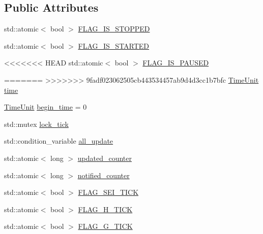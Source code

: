\subsection*{Public Attributes}
{\bf }\par
\begin{DoxyCompactItemize}
\item 
std\+::atomic$<$ bool $>$ \hyperlink{classsolar__core_1_1_w_a9bb998c65a7427961de179f41e25daea}{F\+L\+A\+G\+\_\+\+I\+S\+\_\+\+S\+T\+O\+P\+P\+E\+D}
\item 
std\+::atomic$<$ bool $>$ \hyperlink{classsolar__core_1_1_w_a8456f88d45f2e8bf67eccd7f0c8d08fa}{F\+L\+A\+G\+\_\+\+I\+S\+\_\+\+S\+T\+A\+R\+T\+E\+D}
\item 
<<<<<<< HEAD
std\+::atomic$<$ bool $>$ \hyperlink{classsolar__core_1_1_w_a1c0ebdba727a7a5cbf322072ab5c9184}{F\+L\+A\+G\+\_\+\+I\+S\+\_\+\+P\+A\+U\+S\+E\+D}
\item 
=======
>>>>>>> 9fadf023062505cb443534457ab9d4d3cc1b7bfc
\hyperlink{namespacesolar__core_a4b5949d07259da6f8a20d12a30403e90}{Time\+Unit} \hyperlink{classsolar__core_1_1_w_ae96b30122adc9fae8fc2f209a4c89b0a}{time}
\item 
\hyperlink{namespacesolar__core_a4b5949d07259da6f8a20d12a30403e90}{Time\+Unit} \hyperlink{classsolar__core_1_1_w_aec1b9014ad296dc9b8b132ba9b67c08a}{begin\+\_\+time} = 0
\item 
std\+::mutex \hyperlink{classsolar__core_1_1_w_a56ba20ee51f5db7288e55bb65f12511b}{lock\+\_\+tick}
\item 
std\+::condition\+\_\+variable \hyperlink{classsolar__core_1_1_w_aa6cba0dba8a566978e51fb4204aac4b9}{all\+\_\+update}
\item 
std\+::atomic$<$ long $>$ \hyperlink{classsolar__core_1_1_w_a775d817c6117b462571c3fca62fe0c86}{updated\+\_\+counter}
\item 
std\+::atomic$<$ long $>$ \hyperlink{classsolar__core_1_1_w_afee32d515534826a60ddf12936f85a3d}{notified\+\_\+counter}
\item 
std\+::atomic$<$ bool $>$ \hyperlink{classsolar__core_1_1_w_a65d2047e574ed6201a8e21ec1ba1bec4}{F\+L\+A\+G\+\_\+\+S\+E\+I\+\_\+\+T\+I\+C\+K}
\item 
std\+::atomic$<$ bool $>$ \hyperlink{classsolar__core_1_1_w_a4cd32940e21bfc20919cc2d4447d66d3}{F\+L\+A\+G\+\_\+\+H\+\_\+\+T\+I\+C\+K}
\item 
std\+::atomic$<$ bool $>$ \hyperlink{classsolar__core_1_1_w_aae63ce0d440f2c8d475d6eeafac58238}{F\+L\+A\+G\+\_\+\+G\+\_\+\+T\+I\+C\+K}
\item 

\end{DoxyCompactItemize}
